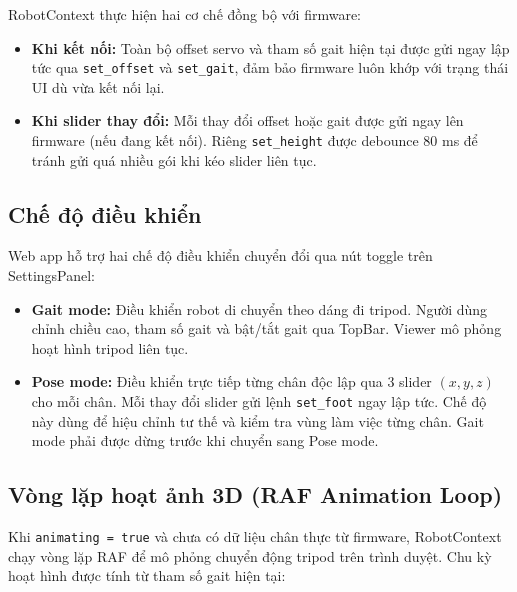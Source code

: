         \hspace{0.5cm} RobotContext thực hiện hai cơ chế đồng bộ với firmware:

        \begin{itemize}
            \item \textbf{Khi kết nối:} Toàn bộ offset servo và tham số gait hiện tại được gửi ngay lập tức qua \texttt{set\_offset} và \texttt{set\_gait}, đảm bảo firmware luôn khớp với trạng thái UI dù vừa kết nối lại.
            \item \textbf{Khi slider thay đổi:} Mỗi thay đổi offset hoặc gait được gửi ngay lên firmware (nếu đang kết nối). Riêng \texttt{set\_height} được debounce 80 ms để tránh gửi quá nhiều gói khi kéo slider liên tục.
        \end{itemize}

        \subsection{Chế độ điều khiển}

        \hspace{0.5cm} Web app hỗ trợ hai chế độ điều khiển chuyển đổi qua nút toggle trên SettingsPanel:

        \begin{itemize}
            \item \textbf{Gait mode:} Điều khiển robot di chuyển theo dáng đi tripod. Người dùng chỉnh chiều cao, tham số gait và bật/tắt gait qua TopBar. Viewer mô phỏng hoạt hình tripod liên tục.
            \item \textbf{Pose mode:} Điều khiển trực tiếp từng chân độc lập qua 3 slider $(x, y, z)$ cho mỗi chân. Mỗi thay đổi slider gửi lệnh \texttt{set\_foot} ngay lập tức. Chế độ này dùng để hiệu chỉnh tư thế và kiểm tra vùng làm việc từng chân. Gait mode phải được dừng trước khi chuyển sang Pose mode.
        \end{itemize}

        \subsection{Vòng lặp hoạt ảnh 3D (RAF Animation Loop)}

        \hspace{0.5cm} Khi \texttt{animating = true} và chưa có dữ liệu chân thực từ firmware, RobotContext chạy vòng lặp RAF để mô phỏng chuyển động tripod trên trình duyệt. Chu kỳ hoạt hình được tính từ tham số gait hiện tại:

